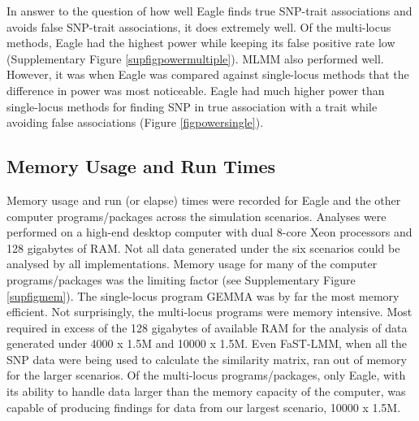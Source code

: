 \documentclass{article}
\begin{document}
In answer to the question of how well Eagle finds true SNP-trait associations and avoids false SNP-trait associations, it does extremely 
well.  Of the multi-locus methods, Eagle had the highest power
while keeping its false positive rate low (Supplementary Figure \ref{supfigpowermultiple}). MLMM also performed well. However, it was when Eagle was compared against single-locus methods 
that the difference in power was most noticeable.  Eagle had much higher power than single-locus methods for finding SNP in true 
association with a trait while avoiding false associations (Figure \ref{figpowersingle}). 





\subsection{Memory Usage and Run Times}

Memory usage and run (or elapse) times were recorded for Eagle and the other computer programs/packages across the simulation scenarios. 
Analyses were performed on a high-end desktop computer with dual 8-core Xeon processors and 128 gigabytes of RAM. Not all data generated under the six scenarios could be analysed by all implementations. Memory usage 
for many of the computer programs/packages was the limiting factor (see Supplementary Figure \ref{supfigmem}).  The single-locus program GEMMA was by 
far the most memory efficient. Not surprisingly, the multi-locus programs were memory intensive. Most required in 
excess of the 128 gigabytes of available RAM for the analysis of data generated under 4000 x 1.5M and 10000 x 1.5M.  
Even FaST-LMM, when all the SNP data were being used to calculate the similarity matrix, ran out of memory for the larger scenarios.
Of the multi-locus programs/packages, only Eagle,  
with its ability to handle data larger than the memory capacity of the computer, was capable of producing findings 
for data from our largest scenario, 10000 x 1.5M. 
\end{document}
